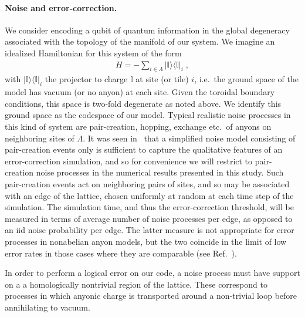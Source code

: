 \documentclass[aps, prl, letterpaper, twocolumn, superscriptaddress, notitlepage, 10pt]{revtex4-1}
\newcommand{\vac}{\mathbb{I}}
\newcommand{\ket}[1]{|{#1}\rangle}
\newcommand{\bra}[1]{\langle{#1}|}
\newcommand{\ketbra}[2]{\ket{#1}\!\bra{#2}}
\newcommand{\proj}[1]{\ketbra{#1}{#1}}
\begin{document}
\paragraph{Noise and error-correction.}

We consider encoding a qubit of quantum information in the global degeneracy associated 
with the topology of the manifold of our system. We imagine an idealized Hamiltonian for this 
system of the form
\begin{align}
	H=-\sum_{i\in \Lambda}\proj{\vac}_i\;,\label{e:hamiltonian}
\end{align}
with $\proj{\vac}_i$ the projector to charge $\vac$ at site (or tile) $i$, i.e.~the ground 
space of the model has vacuum (or no anyon) at each site. Given the toroidal boundary 
conditions, this space is two-fold degenerate as noted above. We identify this ground space 
as the codespace of our model. Typical realistic noise processes in this kind of system are 
pair-creation, hopping, exchange etc.~of anyons on neighboring sites of $\Lambda$. It was 
seen in~\cite{Brell2013} that a simplified noise model consisting of pair-creation events only 
is sufficient to capture the qualitative features of an error-correction simulation, and so for convenience we 
will restrict to pair-creation noise processes in the numerical results presented in this study. 
Such pair-creation events act on neighboring pairs of sites,
and so may be associated with an edge of the lattice, chosen 
uniformly at random at each time step of the simulation. The simulation time, and thus the 
error-correction threshold, will be measured in terms of average number of noise processes 
per edge, as opposed to an iid noise probability per edge. The latter measure is not 
appropriate for error processes in nonabelian anyon models, but the two coincide in the limit 
of low error rates in those cases where they are comparable (see Ref.~\cite{Brell2013}).

In order to perform a logical error on our code, a noise process must have support on a 
a homologically nontrivial region of the lattice.
These correspond to processes in which anyonic charge is transported around a non-trivial loop before 
annihilating to vacuum.
\end{document}
